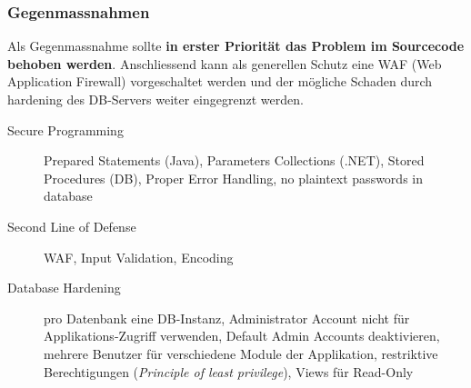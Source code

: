 \subsubsection{Gegenmassnahmen}
Als Gegenmassnahme sollte \textbf{in erster Priorität das Problem im Sourcecode behoben werden}. Anschliessend kann als generellen Schutz eine WAF (Web Application Firewall) vorgeschaltet werden und der mögliche Schaden durch hardening des DB-Servers weiter eingegrenzt werden.

\begin{description}
	\item[Secure Programming] Prepared Statements (Java), Parameters Collections (.NET), Stored Procedures (DB), Proper Error Handling, no plaintext passwords in database
	\item[Second Line of Defense] WAF, Input Validation, Encoding \item[Database Hardening] pro Datenbank eine DB-Instanz, Administrator Account nicht für Applikations-Zugriff verwenden, Default Admin Accounts deaktivieren, mehrere Benutzer für verschiedene Module der Applikation, restriktive Berechtigungen (\textit{Principle of least privilege}), Views für Read-Only
\end{description}